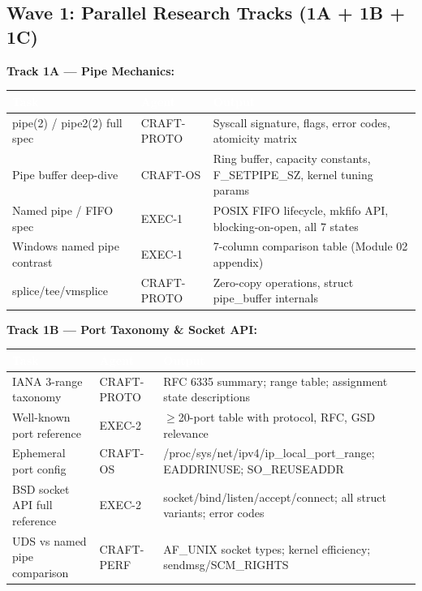 \documentclass[11pt,letterpaper]{article}
\newcommand{\tableheader}[1]{\textbf{\sffamily\textcolor{white}{#1}}}
\begin{document}
\subsection{Wave 1: Parallel Research Tracks (1A + 1B + 1C)}

\textbf{Track 1A --- Pipe Mechanics:}

\begin{center}
\begin{tabularx}{\textwidth}{L{3cm}L{2cm}X}
\toprule
{}
\tableheader{Task} & \tableheader{Agent} & \tableheader{Output} \\
\midrule
pipe(2) / pipe2(2) full spec & CRAFT-PROTO & Syscall signature, flags, error codes, atomicity matrix \\
Pipe buffer deep-dive & CRAFT-OS & Ring buffer, capacity constants, F\_SETPIPE\_SZ, kernel tuning params \\
Named pipe / FIFO spec & EXEC-1 & POSIX FIFO lifecycle, mkfifo API, blocking-on-open, all 7 states \\
Windows named pipe contrast & EXEC-1 & 7-column comparison table (Module 02 appendix) \\
splice/tee/vmsplice & CRAFT-PROTO & Zero-copy operations, struct pipe\_buffer internals \\
\bottomrule
\end{tabularx}
\end{center}

\textbf{Track 1B --- Port Taxonomy \& Socket API:}

\begin{center}
\begin{tabularx}{\textwidth}{L{3cm}L{2cm}X}
\toprule
{}
\tableheader{Task} & \tableheader{Agent} & \tableheader{Output} \\
\midrule
IANA 3-range taxonomy & CRAFT-PROTO & RFC 6335 summary; range table; assignment state descriptions \\
Well-known port reference & EXEC-2 & $\geq$20-port table with protocol, RFC, GSD relevance \\
Ephemeral port config & CRAFT-OS & /proc/sys/net/ipv4/ip\_local\_port\_range; EADDRINUSE; SO\_REUSEADDR \\
BSD socket API full reference & EXEC-2 & socket/bind/listen/accept/connect; all struct variants; error codes \\
UDS vs named pipe comparison & CRAFT-PERF & AF\_UNIX socket types; kernel efficiency; sendmsg/SCM\_RIGHTS \\
\bottomrule
\end{tabularx}
\end{center}
\end{document}
